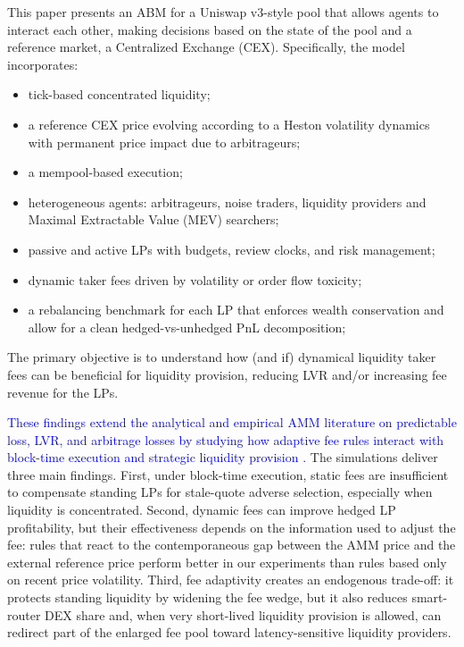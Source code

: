 \documentclass[11pt]{article}
\begin{document}
This paper presents an ABM for a Uniswap v3-style pool that allows agents to interact each other, making decisions based 
on the state of the pool and a reference market, a Centralized Exchange (CEX). Specifically, the model incorporates:
\begin{itemize}[leftmargin=*]
  \item tick-based concentrated liquidity;
  \item a reference CEX price evolving according to a Heston volatility dynamics with permanent price impact due 
  to arbitrageurs;
  \item a mempool-based execution;
  \item heterogeneous agents: arbitrageurs, noise traders, liquidity providers and Maximal Extractable Value (MEV) searchers;
  \item passive and active LPs with budgets, review clocks, and risk management;
  \item dynamic taker fees driven by volatility or order flow toxicity;
  \item a rebalancing benchmark for each LP that enforces wealth conservation and allow for a clean hedged-vs-unhedged 
  PnL decomposition;
\end{itemize}

The primary objective is to understand how (and if) dynamical liquidity taker fees can be beneficial for liquidity provision, 
reducing LVR and/or increasing fee revenue for the LPs.

\textcolor{blue}{These findings extend the analytical and empirical AMM literature on predictable loss, LVR, and arbitrage losses by studying
how adaptive fee rules interact with block-time execution and strategic liquidity provision
\cite{milionis2023,cartea2023,cartea2022execution,fritsch2024}.} The simulations deliver three main findings. First, under block-time execution, static fees are insufficient to compensate
standing LPs for stale-quote adverse selection, especially when liquidity is concentrated. Second, dynamic fees can improve 
hedged LP profitability, but their effectiveness depends on the information used to adjust the fee: rules that react to 
the contemporaneous gap between the AMM price and the external reference price perform better in our experiments than rules 
based only on recent price volatility. Third, fee adaptivity creates an endogenous trade-off: it protects standing liquidity 
by widening the fee wedge, but it also reduces smart-router DEX share and, when very short-lived liquidity provision is 
allowed, can redirect part of the enlarged fee pool toward latency-sensitive liquidity providers.
\end{document}
